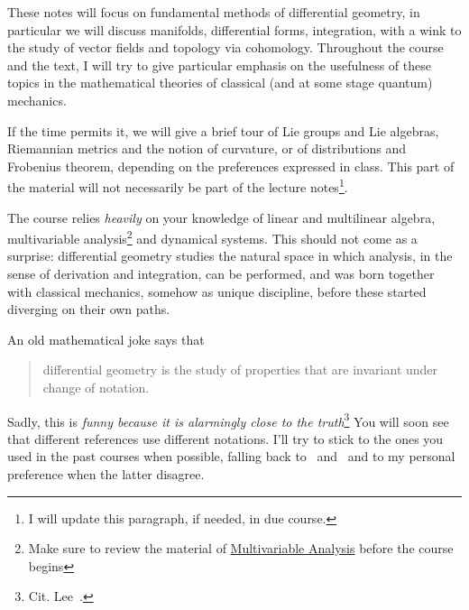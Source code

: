 \documentclass[nobib, a4paper]{tufte-book}
\theoremstyle{plain}
\theoremstyle{definition}
\theoremstyle{remark}
\begin{document}
These notes will focus on fundamental methods of differential geometry, in particular we will discuss manifolds, differential forms, integration, with a wink to the study of vector fields and topology via cohomology.
Throughout the course and the text, I will try to give particular emphasis on the usefulness of these topics in the mathematical theories of classical (and at some stage quantum) mechanics.

If the time permits it, we will give a brief tour of Lie groups and Lie algebras, Riemannian metrics and the notion of curvature, or of distributions and Frobenius theorem, depending on the preferences expressed in class.
This part of the material will not necessarily be part of the lecture notes\footnote{I will update this paragraph, if needed, in due course.}.

The course relies \emph{heavily} on your knowledge of linear and multilinear algebra, multivariable analysis\footnote{Make sure to review the material of \href{http://www.rolandvdv.nl/M19/}{Multivariable Analysis} before the course begins} and dynamical systems.
This should not come as a surprise: differential geometry studies the natural space in which analysis, in the sense of derivation and integration, can be performed, and was born together with classical mechanics, somehow as unique discipline, before these started diverging on their own paths.

An old mathematical joke says that
\begin{quote}
  differential geometry is the study of properties that are invariant under change of notation.
\end{quote}
Sadly, this is \emph{funny because it is alarmingly close to the truth}\footnote{Cit. Lee~\cite{book:lee}.}
You will soon see that different references use different notations. I'll try to stick to the ones you used in the past courses when possible, falling back to~\cite{book:lee} and~\cite{book:tu} and to my personal preference when the latter disagree.
\end{document}

